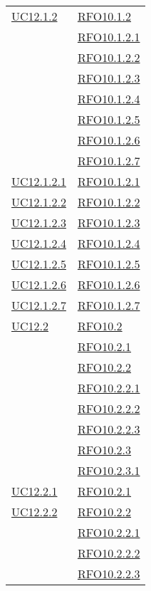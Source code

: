 \begin{longtable}{|>{\centering}m{5cm}|m{5cm}<{\centering}|}
\hyperlink{UC12.1.2}{UC12.1.2} & \hyperlink{RFO10.1.2}{RFO10.1.2}\\
& \hyperlink{RFO10.1.2.1}{RFO10.1.2.1}\\
& \hyperlink{RFO10.1.2.2}{RFO10.1.2.2}\\
& \hyperlink{RFO10.1.2.3}{RFO10.1.2.3}\\
& \hyperlink{RFO10.1.2.4}{RFO10.1.2.4}\\
& \hyperlink{RFO10.1.2.5}{RFO10.1.2.5}\\
& \hyperlink{RFO10.1.2.6}{RFO10.1.2.6}\\
& \hyperlink{RFO10.1.2.7}{RFO10.1.2.7}\\\hline
\hyperlink{UC12.1.2.1}{UC12.1.2.1} & \hyperlink{RFO10.1.2.1}{RFO10.1.2.1}\\\hline
\hyperlink{UC12.1.2.2}{UC12.1.2.2} & \hyperlink{RFO10.1.2.2}{RFO10.1.2.2}\\\hline
\hyperlink{UC12.1.2.3}{UC12.1.2.3} & \hyperlink{RFO10.1.2.3}{RFO10.1.2.3}\\\hline
\hyperlink{UC12.1.2.4}{UC12.1.2.4} & \hyperlink{RFO10.1.2.4}{RFO10.1.2.4}\\\hline
\hyperlink{UC12.1.2.5}{UC12.1.2.5} & \hyperlink{RFO10.1.2.5}{RFO10.1.2.5}\\\hline
\hyperlink{UC12.1.2.6}{UC12.1.2.6} & \hyperlink{RFO10.1.2.6}{RFO10.1.2.6}\\\hline
\hyperlink{UC12.1.2.7}{UC12.1.2.7} & \hyperlink{RFO10.1.2.7}{RFO10.1.2.7}\\\hline
\hyperlink{UC12.2}{UC12.2} & \hyperlink{RFO10.2}{RFO10.2}\\\hline
& \hyperlink{RFO10.2.1}{RFO10.2.1}\\
& \hyperlink{RFO10.2.2}{RFO10.2.2}\\
& \hyperlink{RFO10.2.2.1}{RFO10.2.2.1}\\
& \hyperlink{RFO10.2.2.2}{RFO10.2.2.2}\\
& \hyperlink{RFO10.2.2.3}{RFO10.2.2.3}\\
& \hyperlink{RFO10.2.3}{RFO10.2.3}\\
& \hyperlink{RFO10.2.3.1}{RFO10.2.3.1}\\\hline
\hyperlink{UC12.2.1}{UC12.2.1} & \hyperlink{RFO10.2.1}{RFO10.2.1}\\\hline
\hyperlink{UC12.2.2}{UC12.2.2} & \hyperlink{RFO10.2.2}{RFO10.2.2}\\
& \hyperlink{RFO10.2.2.1}{RFO10.2.2.1}\\
& \hyperlink{RFO10.2.2.2}{RFO10.2.2.2}\\
& \hyperlink{RFO10.2.2.3}{RFO10.2.2.3}\\\hline

\end{longtable}
